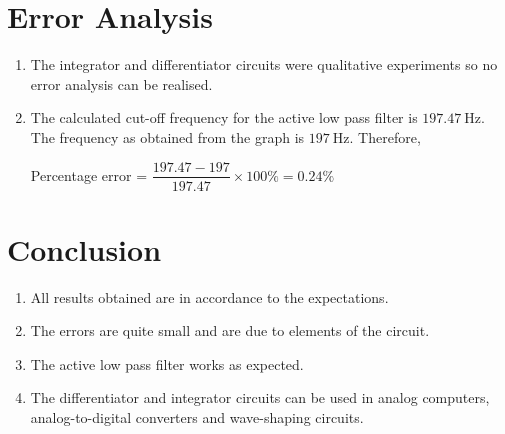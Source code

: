 \section{Error Analysis}
\begin{enumerate}
    \item The integrator and differentiator circuits were qualitative experiments so no error analysis can be realised.
    \item The calculated cut-off frequency for the active low pass filter is $\SI{197.47}{\hertz}$. The frequency as obtained from the graph is $\SI{197}{\hertz}$. Therefore, 
    \begin{center}
         Percentage error = $\dfrac{197.47-197}{197.47}\times 100 \% = 0.24\%$
    \end{center}
\end{enumerate}
\section{Conclusion}
\begin{enumerate}
    \item All results obtained are in accordance to the expectations.
    \item The errors are quite small and are due to elements of the circuit.
    \item The active low pass filter works as expected.
    \item The differentiator and integrator circuits can be used in analog computers, analog-to-digital converters and wave-shaping circuits.
\end{enumerate}